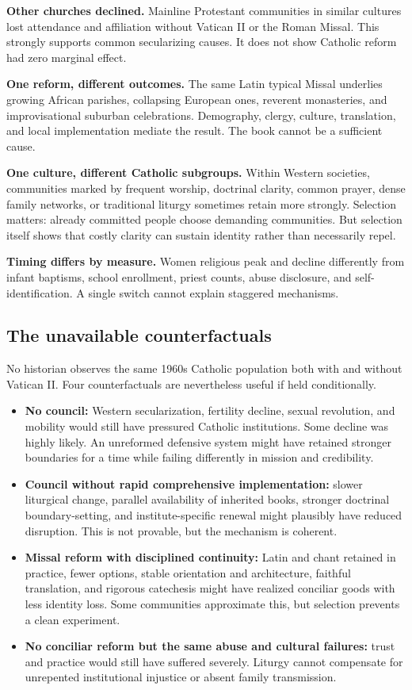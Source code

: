 \textbf{Other churches declined.} Mainline Protestant communities in similar cultures lost attendance and affiliation without Vatican II or the Roman Missal. This strongly supports common secularizing causes. It does not show Catholic reform had zero marginal effect.

\textbf{One reform, different outcomes.} The same Latin typical Missal underlies growing African parishes, collapsing European ones, reverent monasteries, and improvisational suburban celebrations. Demography, clergy, culture, translation, and local implementation mediate the result. The book cannot be a sufficient cause.

\textbf{One culture, different Catholic subgroups.} Within Western societies, communities marked by frequent worship, doctrinal clarity, common prayer, dense family networks, or traditional liturgy sometimes retain more strongly. Selection matters: already committed people choose demanding communities. But selection itself shows that costly clarity can sustain identity rather than necessarily repel.

\textbf{Timing differs by measure.} Women religious peak and decline differently from infant baptisms, school enrollment, priest counts, abuse disclosure, and self-identification. A single switch cannot explain staggered mechanisms.

\subsection{The unavailable counterfactuals}

No historian observes the same 1960s Catholic population both with and without Vatican II. Four counterfactuals are nevertheless useful if held conditionally.

\begin{itemize}
\item \textbf{No council:} Western secularization, fertility decline, sexual revolution, and mobility would still have pressured Catholic institutions. Some decline was highly likely. An unreformed defensive system might have retained stronger boundaries for a time while failing differently in mission and credibility.
\item \textbf{Council without rapid comprehensive implementation:} slower liturgical change, parallel availability of inherited books, stronger doctrinal boundary-setting, and institute-specific renewal might plausibly have reduced disruption. This is not provable, but the mechanism is coherent.
\item \textbf{Missal reform with disciplined continuity:} Latin and chant retained in practice, fewer options, stable orientation and architecture, faithful translation, and rigorous catechesis might have realized conciliar goods with less identity loss. Some communities approximate this, but selection prevents a clean experiment.
\item \textbf{No conciliar reform but the same abuse and cultural failures:} trust and practice would still have suffered severely. Liturgy cannot compensate for unrepented institutional injustice or absent family transmission.
\end{itemize}

